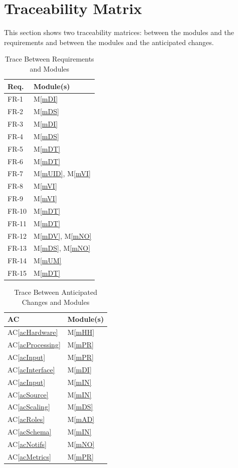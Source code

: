 \documentclass[12pt, titlepage]{article}
\newcommand{\acref}[1]{AC\ref{#1}}
\newcommand{\mref}[1]{M\ref{#1}}
\begin{document}
\section{Traceability Matrix} \label{SecTM}

This section shows two traceability matrices: between the modules and the
requirements and between the modules and the anticipated changes.

\begin{table}[H]
\centering
\begin{tabular}{p{} p{}}
\toprule
\textbf{Req.} & \textbf{Module(s)}\\
\midrule
FR-1 & \mref{mDI} \\
FR-2 & \mref{mDS} \\
FR-3 & \mref{mDI} \\
FR-4 & \mref{mDS} \\
FR-5 & \mref{mDT} \\
FR-6 & \mref{mDT} \\
FR-7 & \mref{mUID}, \mref{mVI} \\
FR-8 & \mref{mVI} \\
FR-9 & \mref{mVI} \\
FR-10 & \mref{mDT} \\
FR-11 & \mref{mDT} \\
FR-12 & \mref{mDV}, \mref{mNO} \\
FR-13 & \mref{mDS}, \mref{mNO} \\
FR-14 & \mref{mUM} \\
FR-15 & \mref{mDT} \\
\bottomrule
\end{tabular}
\caption{Trace Between Requirements and Modules}
\label{TblRT}
\end{table}

\begin{table}[H]
\centering
\begin{tabular}{p{} p{}}
\toprule
\textbf{AC} & \textbf{Module(s)}\\
\midrule
\acref{acHardware} & \mref{mHH}\\
\acref{acProcessing} & \mref{mPR}\\
\acref{acInput} & \mref{mPR}\\
\acref{acInterface} & \mref{mDI}\\
\acref{acInput} & \mref{mIN}\\
\acref{acSource} & \mref{mIN}\\
\acref{acScaling} & \mref{mDS}\\
\acref{acRoles} & \mref{mAD}\\
\acref{acSchema} & \mref{mIN}\\
\acref{acNotifs} & \mref{mNO}\\
\acref{acMetrics} & \mref{mPR}\\
\bottomrule
\end{tabular}
\caption{Trace Between Anticipated Changes and Modules}
\label{TblACT}
\end{table}
\end{document}

